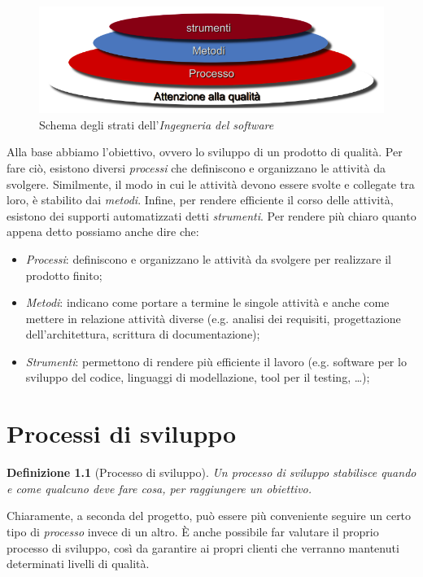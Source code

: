 \documentclass[12pt, a4paper]{report}
\theoremstyle{def}
\newtheorem{definition}{Definizione}
\theoremstyle{definition}
\begin{document}
\begin{figure}[h]
    \centering
    \includegraphics[width=\textwidth]{strati-is.png}
    \caption{Schema degli strati dell'\emph{Ingegneria del software}}
\end{figure}\noindent
Alla base abbiamo l'obiettivo, ovvero lo sviluppo di un prodotto di qualità.
Per fare ciò, esistono diversi \emph{processi} che definiscono e organizzano le
attività da svolgere. Similmente, il modo in cui le attività devono essere svolte
e collegate tra loro, è stabilito dai \emph{metodi}. Infine, per rendere efficiente
il corso delle attività, esistono dei supporti automatizzati detti \emph{strumenti}.
\newpage
\noindent Per rendere più chiaro quanto appena detto possiamo anche dire che:
\begin{itemize}
    \item \emph{Processi}: definiscono e organizzano le attività da svolgere per
    realizzare il prodotto finito;
    \item \emph{Metodi}: indicano come portare a termine le singole attività e
    anche come mettere in relazione attività diverse (e.g. analisi dei requisiti,
    progettazione dell'architettura, scrittura di documentazione);
    \item \emph{Strumenti}: permettono di rendere più efficiente il lavoro
    (e.g. software per lo sviluppo del codice, linguaggi di modellazione, tool
    per il testing, \dots);
\end{itemize}

\chapter{Processi di sviluppo}
\begin{definition}[Processo di sviluppo]
    Un \emph{processo di sviluppo} stabilisce quando e come qualcuno deve fare
    cosa, per raggiungere un obiettivo.
\end{definition}\noindent
Chiaramente, a seconda del progetto, può essere più conveniente seguire un certo
tipo di \emph{processo} invece di un altro. È anche possibile far valutare il
proprio processo di sviluppo, così da garantire ai propri clienti che verranno
mantenuti determinati livelli di qualità.
\end{document}
